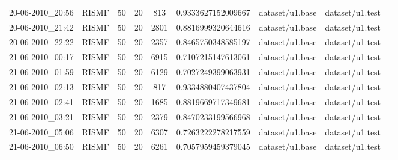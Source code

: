 \documentclass[10pt,a4paper]{article}  %
\begin{document}
\begin{table}[ht]
\begin{tabular}{ccccccccc}
    20-06-2010\_20:56 & RISMF & 50 & 20 & 813 & 0.9333627152009667 & dataset/u1.base & dataset/u1.test \\
    20-06-2010\_21:42 & RISMF & 50 & 20 & 2801 & 0.8816999320644616 & dataset/u1.base & dataset/u1.test\\
    20-06-2010\_22:22 & RISMF & 50 & 20 & 2357 & 0.8465750348585197 & dataset/u1.base & dataset/u1.test\\
    21-06-2010\_00:17 & RISMF & 50 & 20 & 6915 & 0.7107215147613061 & dataset/u1.base & dataset/u1.test\\
    21-06-2010\_01:59 & RISMF & 50 & 20 & 6129 & 0.7027249399063931 & dataset/u1.base & dataset/u1.test\\
    21-06-2010\_02:13 & RISMF & 50 & 20 & 817 & 0.9334880407437804 & dataset/u1.base & dataset/u1.test \\
    21-06-2010\_02:41 & RISMF & 50 & 20 & 1685 & 0.8819669717349681 & dataset/u1.base & dataset/u1.test\\
    21-06-2010\_03:21 & RISMF & 50 & 20 & 2379 & 0.8470233199566968 & dataset/u1.base & dataset/u1.test\\
    21-06-2010\_05:06 & RISMF & 50 & 20 & 6307 & 0.7263222278217559 & dataset/u1.base & dataset/u1.test\\
    21-06-2010\_06:50 & RISMF & 50 & 20 & 6261 & 0.7057959459379045 & dataset/u1.base & dataset/u1.test\\  \bottomrule
    \end{tabular}
    \label{tag:final_results}
  \end{table}

\newpage


\small


\end{document}
